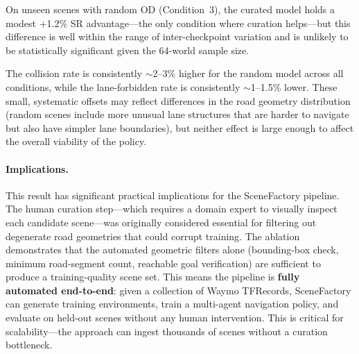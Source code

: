 On unseen scenes with random OD (Condition~3), the curated model holds a modest +1.2\% SR advantage---the only condition where curation helps---but this difference is well within the range of inter-checkpoint variation and is unlikely to be statistically significant given the 64-world sample size.

The collision rate is consistently $\sim$2--3\% higher for the random model across all conditions, while the lane-forbidden rate is consistently $\sim$1--1.5\% lower.
These small, systematic offsets may reflect differences in the road geometry distribution (random scenes include more unusual lane structures that are harder to navigate but also have simpler lane boundaries), but neither effect is large enough to affect the overall viability of the policy.

\paragraph{Implications.}
This result has significant practical implications for the SceneFactory pipeline.
The human curation step---which requires a domain expert to visually inspect each candidate scene---was originally considered essential for filtering out degenerate road geometries that could corrupt training.
The ablation demonstrates that the automated geometric filters alone (bounding-box check, minimum road-segment count, reachable goal verification) are sufficient to produce a training-quality scene set.
This means the pipeline is \textbf{fully automated end-to-end}: given a collection of Waymo TFRecords, SceneFactory can generate training environments, train a multi-agent navigation policy, and evaluate on held-out scenes without any human intervention.
This is critical for scalability---the approach can ingest thousands of scenes without a curation bottleneck.

